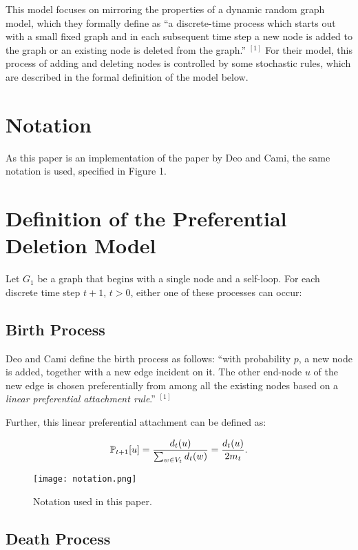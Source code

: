 \documentclass[final,3p,times,twocolumn]{elsarticle}
\begin{document}
This model focuses on mirroring the properties of a dynamic random graph model, which they formally define as “a discrete-time process which starts out with a small fixed graph and in each subsequent time step a new node is added to the graph or an existing node is deleted from the graph.” $^{[1]}$ For their model, this process of adding and deleting nodes is controlled by some stochastic rules, which are described in the formal definition of the model below.

\section{Notation}
\label{S:2}

As this paper is an implementation of the paper by Deo and Cami, the same notation is used, specified in Figure 1.

\section{Definition of the Preferential Deletion Model}
\label{S:3}

Let $G_1$ be a graph that begins with a single node and a self-loop. For each discrete time step $t + 1$, $t > 0$, either one of these processes can occur:

\subsection{Birth Process}

Deo and Cami define the birth process as follows: “with probability $p$, a new node is added, together with a new edge incident on it. The other end-node $u$ of the new edge is chosen preferentially from among all the existing nodes based on a \textit{linear preferential attachment rule}.” $^{[1]}$

Further, this linear preferential attachment can be defined as:

\begin{equation}
\centering
    \mathbb{P}_{t + 1}[u] = \frac{d_t(u)}{\sum_{w \in V_t} d_t(w)} = \frac{d_t(u)}{2m_t}.
\end{equation}

\begin{figure}[h]
\centering\texttt{[image: notation.png]}
\caption{Notation used in this paper.}
\end{figure}

\subsection{Death Process}
\end{document}
